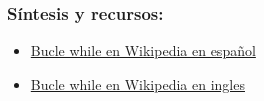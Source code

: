 \documentclass{beamer}
\begin{document}
\begin{frame}
\frametitle{Síntesis y recursos:}

\begin{itemize}
\item \href{https://es.wikipedia.org/wiki/Bucle_while}{Bucle while en Wikipedia en español}
\item \href{https://en.wikipedia.org/wiki/While_loop}{Bucle while en Wikipedia en ingles}

\end{itemize}
\end{frame}
\end{document}
